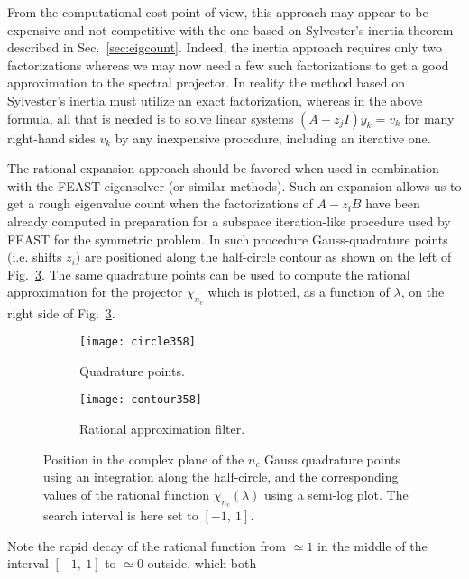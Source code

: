 \documentclass[12pt]{article}		\usepackage{tabls,multirow}
\begin{document}
From the computational cost point of view, this approach may appear to be
expensive and not competitive with the one based on Sylvester's
inertia theorem described in Sec.~\ref{sec:eigcount}. Indeed, the
inertia approach requires only two factorizations whereas we may now
need a few such factorizations to get a good approximation to the
spectral projector. In reality the method based on Sylvester's
inertia must utilize an exact factorization, whereas in the above
formula, all that is needed is to solve linear systems $(A-z_j I) y_k
= v_k$ for many right-hand sides $v_k$ by any inexpensive procedure,
including an iterative one. 
 
The rational expansion approach should be favored when used in
combination with the FEAST eigensolver
\cite{FEAST,FEASTsolver,FEASTdoc} (or similar methods). Such an
expansion allows us to get a rough eigenvalue count when the
factorizations of $A - z_i B$ have been already computed in
preparation for a subspace iteration-like procedure used by FEAST for
the symmetric problem. In such procedure Gauss-quadrature points
(i.e. shifts $z_i$) are positioned along the half-circle contour as
shown on the left of Fig.~\ref{fig:gauss}. The same quadrature
points can be used to compute the rational approximation for the
projector $\chi_{n_c}$ which is plotted, as a function of $\lambda$,
on the right side of Fig.~\ref{fig:gauss}.
\begin{figure}[hbt]
\centering
  \begin{subfigure}[b]{0.495\textwidth}
                \centering
                \texttt{[image: circle358]}
                \caption{Quadrature points.}
                \label{fig:quadnod}
  \end{subfigure}
  \begin{subfigure}[b]{0.495\textwidth}
                \centering
                \texttt{[image: contour358]}
                \caption{Rational approximation filter.}
                \label{fig:rafil}
  \end{subfigure}
  \caption{Position in the complex plane of the $n_c$ Gauss quadrature
    points using an integration along the half-circle, and the
    corresponding values of the rational function
    $\chi_{n_c}(\lambda)$ using a semi-log plot. The search interval
    is here set to $[-1, \ 1]$.}
\label{fig:gauss}
\end{figure} 
Note the rapid decay of the rational function from $\simeq 1$ in the
middle of the interval $[-1, \ 1]$ to $\simeq 0$ outside, which both
\end{document}

